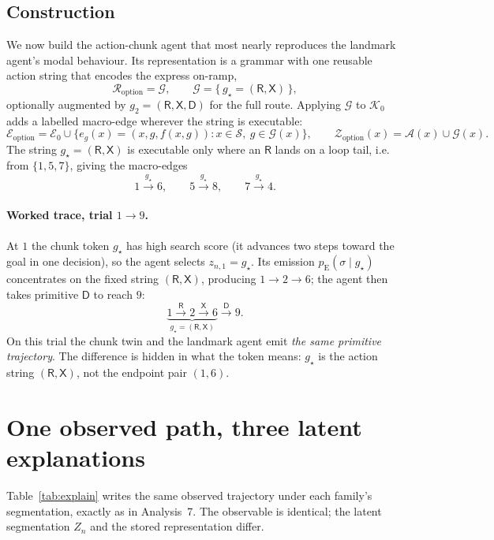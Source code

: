 \documentclass[11pt]{article}
\begin{document}
\subsection{Construction}

We now build the action-chunk agent that most nearly reproduces the landmark agent's modal
behaviour. Its representation is a grammar with one reusable action string that encodes the
express on-ramp,
\[
\mathcal R_{\mathrm{option}}=\mathcal G,
\qquad
\mathcal G=\{\,g_\star=(\mathsf R,\mathsf X)\,\},
\]
optionally augmented by $g_2=(\mathsf R,\mathsf X,\mathsf D)$ for the full route. Applying
$\mathcal G$ to $\mathcal K_0$ adds a labelled macro-edge wherever the string is
executable:
\[
\mathcal E_{\mathrm{option}}
=\mathcal E_0\cup\{e_{g}(x)=(x,g,f(x,g)):x\in\mathcal S,\ g\in\mathcal G(x)\},
\qquad
\mathcal Z_{\mathrm{option}}(x)=\mathcal A(x)\cup\mathcal G(x).
\]
The string $g_\star=(\mathsf R,\mathsf X)$ is executable only where an $\mathsf R$ lands on
a loop tail, i.e. from $\{1,5,7\}$, giving the macro-edges
\[
1\xrightarrow{g_\star}6,\qquad
5\xrightarrow{g_\star}8,\qquad
7\xrightarrow{g_\star}4 .
\]

\paragraph{Worked trace, trial $1\to9$.}
At $1$ the chunk token $g_\star$ has high search score (it advances two steps toward the
goal in one decision), so the agent selects $z_{n,1}=g_\star$. Its emission
$p_{\mathrm E}(\sigma\mid g_\star)$ concentrates on the fixed string $(\mathsf R,\mathsf X)$,
producing $1\to2\to6$; the agent then takes primitive $\mathsf D$ to reach $9$:
\[
\underbrace{1\xrightarrow{\mathsf R}2\xrightarrow{\mathsf X}6}_{g_\star=(\mathsf R,\mathsf X)}
\xrightarrow{\mathsf D}9 .
\]
On this trial the chunk twin and the landmark agent emit \emph{the same primitive
trajectory}. The difference is hidden in what the token means: $g_\star$ is the action
string $(\mathsf R,\mathsf X)$, not the endpoint pair $(1,6)$.

\section{One observed path, three latent explanations}

Table~\ref{tab:explain} writes the same observed trajectory under each family's
segmentation, exactly as in Analysis~7. The observable is identical; the latent
segmentation $Z_n$ and the stored representation differ.
\end{document}
